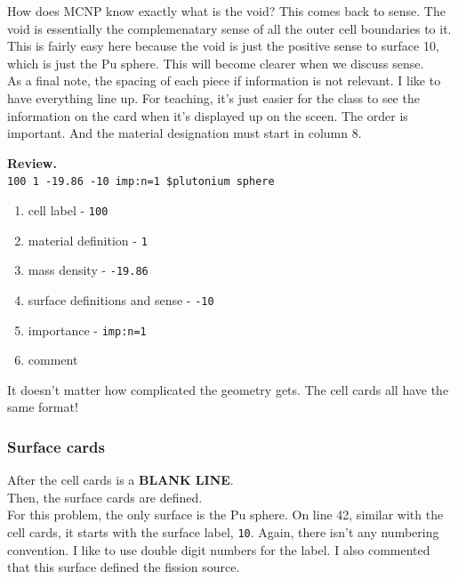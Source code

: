 \documentclass[11pt,a4paper]{article}
\begin{document}
\noindent How does MCNP know exactly what is the void? This comes back to sense. The void is essentially the complemenatary sense of all the outer cell boundaries to it. This is fairly easy here because the void is just the positive sense to surface 10, which is just the Pu sphere. This will become clearer when we discuss sense. \\

\noindent As a final note, the spacing of each piece if information is not relevant. I like to have everything line up. For teaching, it's just easier for the class to see the information on the card when it's displayed up on the sceen. The order is important. And the material designation must start in column 8.

\noindent\textbf{Review.}\\
\noindent\texttt{100    1 -19.86       -10       imp:n=1       \$plutonium sphere}\\

\begin{enumerate}[topsep=0pt,itemsep=-1ex,partopsep=1ex,parsep=1ex]
    \item cell label - \texttt{100}
    \item material definition - \texttt{1}
    \item mass density - \texttt{-19.86}
    \item surface definitions and sense - \texttt{-10}
    \item importance - \texttt{imp:n=1}
    \item comment
\end{enumerate}
\vspace*{\baselineskip}

\noindent It doesn't matter how complicated the geometry gets. The cell cards all have the same format!

\subsubsection{Surface cards}
\noindent After the cell cards is a \textbf{BLANK LINE}. \\

\noindent Then, the surface cards are defined.\\

\noindent For this problem, the only surface is the Pu sphere. On line 42, similar with the cell cards, it starts with the surface label, \texttt{10}. Again, there isn't any numbering convention. I like to use double digit numbers for the label. I also commented that this surface defined the fission source. \\
\end{document}
